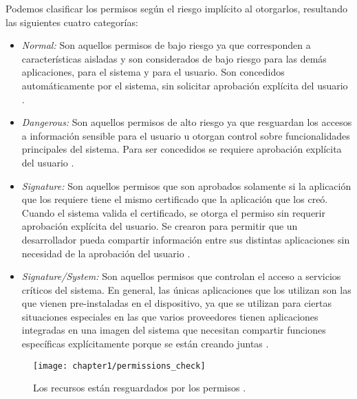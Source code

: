 Podemos clasificar los permisos según el riesgo implícito al otorgarlos, resultando las siguientes cuatro categorías:
\begin{itemize}
    \item \emph{Normal:} Son aquellos permisos de bajo riesgo ya que corresponden a características aisladas y son considerados de bajo riesgo para las demás aplicaciones, para el sistema y para el usuario. Son concedidos automáticamente por el sistema, sin solicitar aprobación explícita del usuario \cite{Rom14}.
    \item \emph{Dangerous:} Son aquellos permisos de alto riesgo ya que resguardan los accesos a información sensible para el usuario u otorgan control sobre funcionalidades principales del sistema. Para ser concedidos se requiere aprobación explícita del usuario \cite{Rom14}. 
    \item \emph{Signature:} Son aquellos permisos que son aprobados solamente si la aplicación que los requiere tiene el mismo certificado que la aplicación que los creó. Cuando el sistema valida el certificado, se otorga el permiso sin requerir aprobación explícita del usuario. Se crearon para permitir que un desarrollador pueda compartir información entre sus distintas aplicaciones sin necesidad de la aprobación del usuario \cite{Rom14}.
    \item \emph{Signature/System:} Son aquellos permisos que controlan el acceso a servicios críticos del sistema. En general, las únicas aplicaciones que los utilizan son las que vienen pre-instaladas en el dispositivo, ya que se utilizan para ciertas situaciones especiales en las que varios proveedores tienen aplicaciones integradas en una imagen del sistema que necesitan compartir funciones específicas explícitamente porque se están creando juntas \cite{Rom14}.
\end{itemize}
\begin{figure}[tbp]
	\begin{center}
		\texttt{[image: chapter1/permissions\_check]}
		\caption{Los recursos están resguardados por los permisos \cite{aossec}.}
		\label{fig:ch01:permissions-check}
	\end{center}
\end{figure}
\newpage
